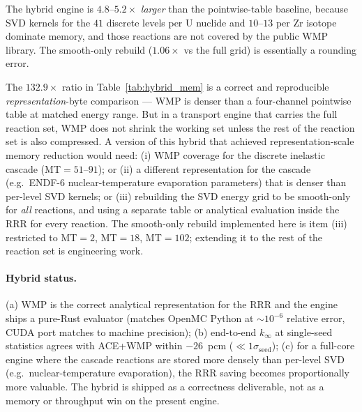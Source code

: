 The hybrid engine is $4.8$--$5.2\times$ \emph{larger} than
the pointwise-table baseline, because SVD kernels for the
$41$ discrete levels per U nuclide and $10$--$13$ per Zr
isotope dominate memory, and those reactions are not covered
by the public WMP library. The smooth-only rebuild
($1.06\times$ vs the full grid) is essentially a rounding
error.

The $132.9\times$ ratio in Table~\ref{tab:hybrid_mem} is a
correct and reproducible \emph{representation}-byte
comparison --- WMP is denser than a four-channel pointwise
table at matched energy range. But in a transport engine that
carries the full reaction set, WMP does not shrink the
working set unless the rest of the reaction set is also
compressed. A version of this hybrid that achieved
representation-scale memory reduction would need: (i) WMP
coverage for the discrete inelastic cascade
(MT$=51$--$91$); or (ii) a different representation for the
cascade (e.g.\ ENDF-6 nuclear-temperature evaporation
parameters) that is denser than per-level SVD kernels; or
(iii) rebuilding the SVD energy grid to be smooth-only for
\emph{all} reactions, and using a separate table or
analytical evaluation inside the RRR for every reaction. The
smooth-only rebuild implemented here is item (iii)
restricted to MT$=2$, MT$=18$, MT$=102$; extending it to
the rest of the reaction set is engineering work.

\paragraph{Hybrid status.}
(a) WMP is the correct analytical representation for the
RRR and the engine ships a pure-Rust evaluator (matches
OpenMC Python at $\sim\!10^{-6}$ relative error, CUDA port
matches to machine precision);
(b) end-to-end $k_\infty$ at single-seed statistics agrees
with ACE+WMP within $-26$~pcm ($\ll 1\sigma_\text{seed}$);
(c) for a full-core engine where the cascade reactions are
stored more densely than per-level SVD (e.g.\
nuclear-temperature evaporation), the RRR saving becomes
proportionally more valuable. The hybrid is shipped as a
correctness deliverable, not as a memory or throughput win
on the present engine.


